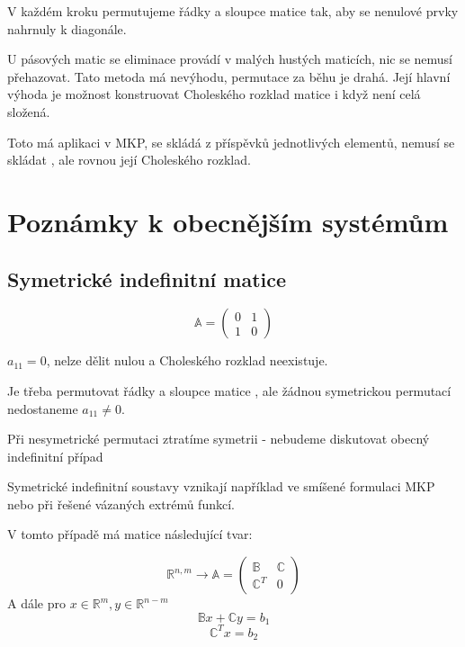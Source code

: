 \documentclass[../main.tex]{subfiles}
\begin{document}
V každém kroku permutujeme řádky a sloupce matice \matA tak, aby se nenulové prvky nahrnuly k diagonále.

U pásových matic se eliminace provádí v malých hustých maticích, nic se nemusí přehazovat.
Tato metoda má nevýhodu, permutace za běhu je drahá. 
Její hlavní výhoda je možnost konstruovat Choleského rozklad matice \matA i když \matA není celá složená.

Toto má aplikaci v MKP, \matA se skládá z příspěvků jednotlivých elementů, nemusí se skládat \matA , ale rovnou její Choleského rozklad.



\section{Poznámky k obecnějším systémům}

\subsection{Symetrické indefinitní matice}

\begin{example}
    \begin{equation*}        
        \mathbb{A} = \begin{pmatrix}
            0 & 1 \\
            1 & 0
        \end{pmatrix}
    \end{equation*}

    $a_{11}=0$, nelze dělit nulou a Choleského rozklad neexistuje.

    Je třeba permutovat řádky a sloupce matice \matA, ale žádnou symetrickou permutací nedostaneme $a_{11}\neq 0$.

    Při nesymetrické permutaci ztratíme symetrii - nebudeme diskutovat obecný indefinitní případ
\end{example}

Symetrické indefinitní soustavy vznikají například ve smíšené formulaci MKP nebo při řešené vázaných extrémů funkcí.

V tomto případě má matice \matA následující tvar:

\begin{equation*}
    \mathbb{R}^{n,m} \rightarrow \mathbb{A} = \begin{pmatrix}
        \mathbb{B} & \mathbb{C}\\
        \mathbb{C}^T & 0
    \end{pmatrix}
\end{equation*}
A dále pro $x\in \mathbb{R}^m, y \in \mathbb{R}^{n-m}$
\begin{equation}\label{eq:2-11:prvni}
    \mathbb{B} x + \mathbb{C} y = b_1
\end{equation}
\begin{equation}\label{eq:2-11:druha}
    \mathbb{C}^T x = b_2
\end{equation}
\end{document}
